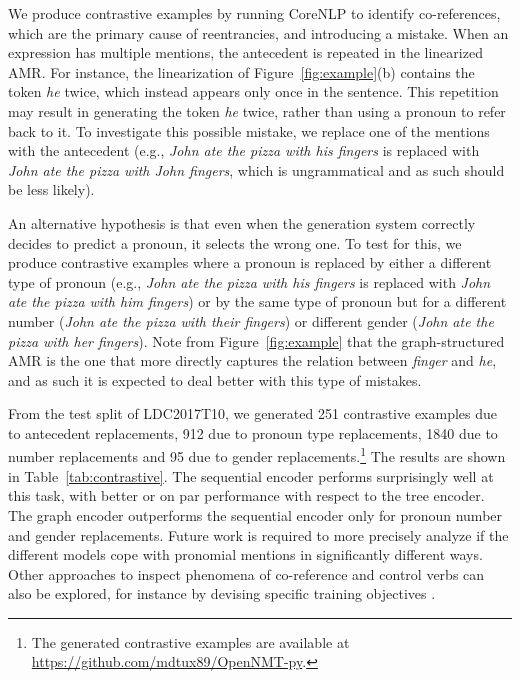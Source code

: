 \documentclass[11pt,a4paper]{article}
\begin{document}
We produce contrastive examples by running CoreNLP \cite{corenlp} to identify co-references, which are the primary cause of reentrancies, and introducing a mistake. 
When an expression has multiple mentions, the antecedent is repeated in the linearized AMR. For instance, the linearization of Figure~\ref{fig:example}(b) contains the token \emph{he} twice, which instead appears only once in the sentence. This repetition may result in generating the token \emph{he} twice, rather than using a pronoun to refer back to it. To investigate this possible mistake, we replace one of the mentions with the antecedent (e.g., \emph{John ate the pizza with his fingers} is replaced with \emph{John ate the pizza with John fingers}, which is ungrammatical and as such should be less likely). 

An alternative hypothesis is that even when the generation system correctly decides to predict a pronoun, it selects the wrong one. To test for this, we produce contrastive examples where a pronoun is replaced by either a different type of pronoun (e.g., \emph{John ate the pizza with his fingers} is replaced with \emph{John ate the pizza with him fingers}) or by the same type of pronoun but for a different number (\emph{John ate the pizza with their fingers}) or different gender (\emph{John ate the pizza with her fingers}). Note from Figure~\ref{fig:example} that the graph-structured AMR is the one that more directly captures the relation between \emph{finger} and \emph{he}, and as such it is expected to deal better with this type of mistakes.


From the test split of LDC2017T10, we generated 251 contrastive examples due to antecedent replacements, 912 due to pronoun type replacements, 1840 due to number replacements and 95 due to gender replacements.\footnote{The generated contrastive examples are available at \url{https://github.com/mdtux89/OpenNMT-py}.}
The results are shown in Table~\ref{tab:contrastive}. The sequential encoder performs surprisingly well at this task, with better or on par performance with respect to the tree encoder. The graph encoder outperforms the sequential encoder only for pronoun number and gender replacements. 
Future work is required to more precisely analyze if the different models cope with pronomial mentions in significantly different ways. Other approaches to inspect phenomena of co-reference and control verbs can also be explored, for instance by devising specific training objectives \cite{linzen2016assessing}.
\end{document}
